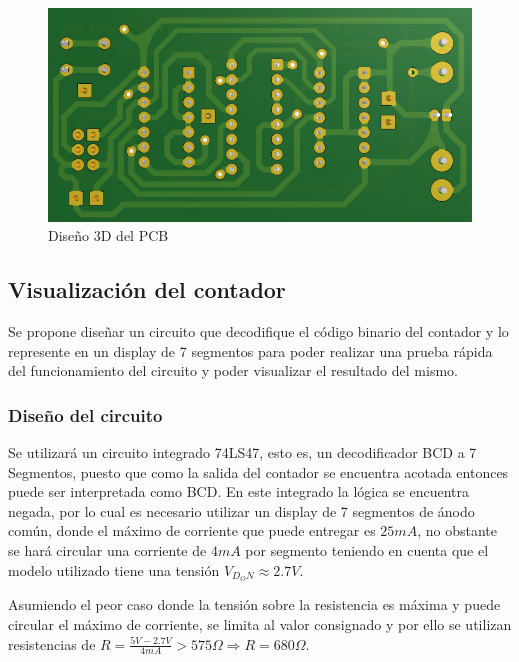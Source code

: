 \begin{figure}[H]
    \centering
    \includegraphics[scale=0.6]{../EJ7/Recursos/3d_bottom_sincronico.PNG} 
    \caption{Dise\~no 3D del PCB}
    \label{fig:3d_sincronico_bottom}
\end{figure}

\subsection{Visualizaci\'on del contador}
Se propone dise\~nar un circuito que decodifique el c\'odigo binario del contador y lo represente en un display
de 7 segmentos para poder realizar una prueba r\'apida del funcionamiento del circuito y poder visualizar el resultado del mismo.

\subsubsection{Dise\~no del circuito}
Se utilizar\'a un circuito integrado 74LS47, esto es, un decodificador BCD a 7 Segmentos, puesto que como la salida del contador se encuentra acotada
entonces puede ser interpretada como BCD. En este integrado la l\'ogica se encuentra negada, por lo cual es necesario utilizar un display de 7 segmentos de \'anodo com\'un,
donde el m\'aximo de corriente que puede entregar es $25mA$, no obstante se har\'a circular una corriente de $4mA$ por segmento teniendo en cuenta que el modelo utilizado tiene una
tensi\'on $V_{D_ON} \approx 2.7V$.

Asumiendo el peor caso donde la tensi\'on sobre la resistencia es m\'axima y puede circular el m\'aximo de corriente, se limita al valor consignado y por ello se utilizan resistencias
de $R = \frac{5V - 2.7V}{4mA} > 575 \Omega \Rightarrow R = 680 \Omega$.

